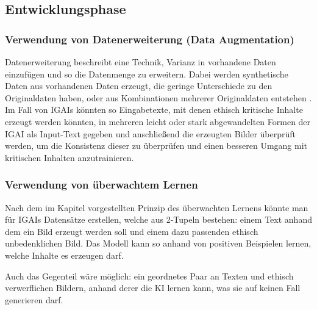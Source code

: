\documentclass[12pt]{report}
\begin{document}
\subsection{Entwicklungsphase}

\subsubsection{Verwendung von Datenerweiterung (Data Augmentation)}
Datenerweiterung beschreibt eine Technik, Varianz in vorhandene Daten einzufügen und so die Datenmenge zu erweitern. Dabei werden synthetische Daten aus vorhandenen Daten erzeugt, die geringe Unterschiede zu den Originaldaten haben, oder aus Kombinationen mehrerer Originaldaten entstehen \cite[S. 2]{Shorten}. %
Im Fall von \ac{IGAI}s könnten so Eingabetexte, mit denen ethisch kritische Inhalte erzeugt werden könnten, in mehreren leicht oder stark abgewandelten Formen der IGAI als Input-Text 
gegeben und anschließend die erzeugten Bilder überprüft werden, um die Konsistenz dieser zu überprüfen und einen besseren Umgang mit kritischen Inhalten anzutrainieren.  

\subsubsection{Verwendung von überwachtem Lernen}\label{Supervised Learning}
Nach dem im Kapitel  vorgestellten Prinzip des überwachten Lernens könnte man für \ac{IGAI}s Datensätze erstellen, welche aus 2-Tupeln bestehen: einem Text anhand dem ein Bild erzeugt werden soll und einem dazu passenden ethisch unbedenklichen Bild. Das Modell kann so anhand von positiven Beispielen lernen, welche Inhalte es erzeugen darf.

Auch das Gegenteil wäre möglich: ein geordnetes Paar an Texten und ethisch verwerflichen Bildern, anhand derer die KI lernen kann, was sie auf keinen Fall generieren darf.
\end{document}
